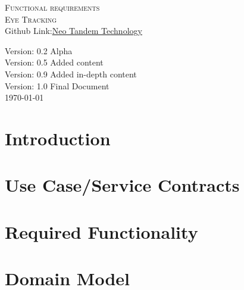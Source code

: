 \documentclass[a4paper,12pt]{report}
\begin{document}
\renewcommand{\thesection}{\arabic{section}}
\newpage
\begin{center}
\textsc{\LARGE Functional requirements}\\[1.5cm]
\textsc{\Large Eye Tracking}\\[0.5cm]

Github Link:\href{https://github.com/MichaelNunes/Neo-Tandem-Tech-Eye-Tracking}{Neo Tandem Technology}

Version: 0.2 Alpha \\
Version: 0.5 Added content\\
Version: 0.9 Added in-depth content\\
Version: 1.0 Final Document\\ 
\today
\end{center}
\tableofcontents{}
\listoffigures{}
\newpage
\section{Introduction}
	
	\newpage
\section{Use Case/Service Contracts}
	
	\newpage
\section{Required Functionality}
	
	\newpage
\section{Domain Model}
	
\end{document}

